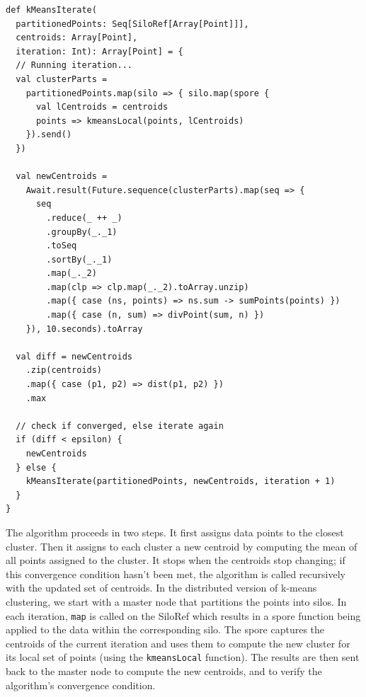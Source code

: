 \documentclass{jfp1}
\begin{document}

\begin{lstlisting}
def kMeansIterate(
  partitionedPoints: Seq[SiloRef[Array[Point]]],
  centroids: Array[Point],
  iteration: Int): Array[Point] = {
  // Running iteration...
  val clusterParts =
    partitionedPoints.map(silo => { silo.map(spore {
      val lCentroids = centroids
      points => kmeansLocal(points, lCentroids)
    }).send()
  })

  val newCentroids =
    Await.result(Future.sequence(clusterParts).map(seq => {
      seq
        .reduce(_ ++ _)
        .groupBy(_._1)
        .toSeq
        .sortBy(_._1)
        .map(_._2)
        .map(clp => clp.map(_._2).toArray.unzip)
        .map({ case (ns, points) => ns.sum -> sumPoints(points) })
        .map({ case (n, sum) => divPoint(sum, n) })
    }), 10.seconds).toArray

  val diff = newCentroids
    .zip(centroids)
    .map({ case (p1, p2) => dist(p1, p2) })
    .max

  // check if converged, else iterate again
  if (diff < epsilon) {
    newCentroids
  } else {
    kMeansIterate(partitionedPoints, newCentroids, iteration + 1)
  }
}
\end{lstlisting}
\noindent
The algorithm proceeds in two steps. It first assigns data points to
the closest cluster. Then it assigns to each cluster a new centroid by
computing the mean of all points assigned to the cluster. It stops
when the centroids stop changing; if this convergence condition hasn't
been met, the algorithm is called recursively with the updated set of
centroids. In the distributed version of k-means clustering, we start
with a master node that partitions the points into silos. In each
iteration, \verb|map| is called on the SiloRef which results in a
spore function being applied to the data within the corresponding
silo. The spore captures the centroids of the current iteration and
uses them to compute the new cluster for its local set of points
(using the \verb|kmeansLocal| function). The results are then sent
back to the master node to compute the new centroids, and to verify
the algorithm's convergence condition.
\end{document}
